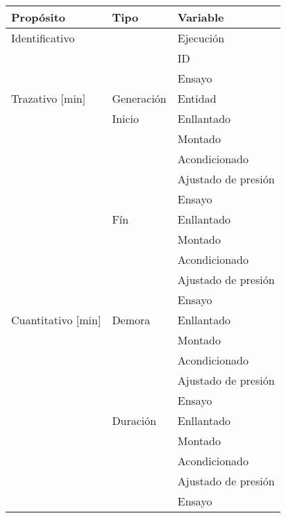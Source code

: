 \documentclass[varwidth=\maxdimen]{standalone}
\begin{document}
\begin{tabular}{ l l l }
	\toprule
	Propósito		& Tipo		& Variable \\
	\midrule
	Identificativo	&			& Ejecución \\
					&			& ID \\
					& 			& Ensayo \\
	\addlinespace
	\addlinespace
	Trazativo [min]	& Generación & Entidad \\ 
	\addlinespace
					& Inicio	& Enllantado \\ 
					& 			& Montado \\ 
					& 			& Acondicionado \\ 
					& 			& Ajustado de presión \\ 
					& 			& Ensayo \\ 
	\addlinespace
					& Fín		& Enllantado \\ 
					& 			& Montado \\ 
					& 			& Acondicionado \\ 
					& 			& Ajustado de presión \\ 
					& 			& Ensayo \\ 
	\addlinespace
	Cuantitativo [min]	& Demora	& Enllantado\\ 
						& 			& Montado \\ 
						& 			& Acondicionado \\ 
						& 			& Ajustado de presión \\ 
						& 			& Ensayo \\ 
	\addlinespace
					& Duración	& Enllantado \\ 
					& 			& Montado \\ 
					& 			& Acondicionado \\ 
					& 			& Ajustado de presión \\ 
					& 			& Ensayo \\ 
							
	\bottomrule
\end{tabular}
\end{document}
